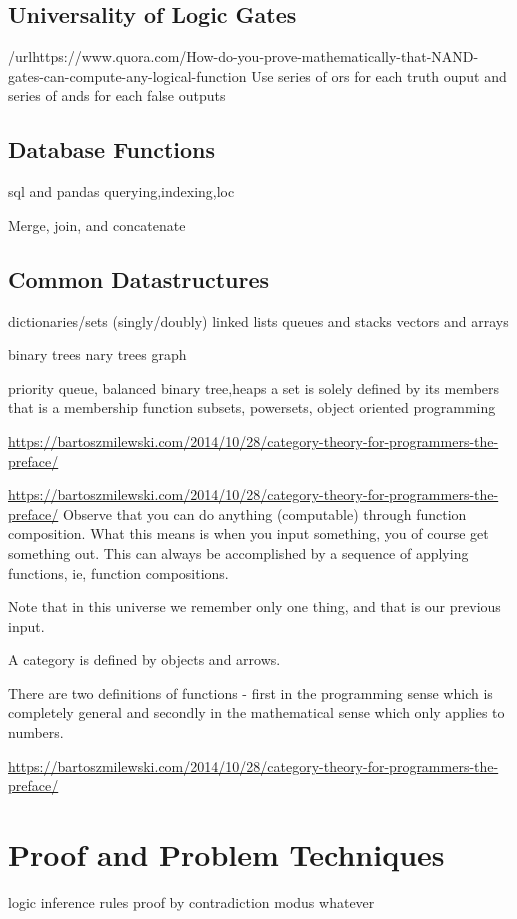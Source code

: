 \documentclass{book}
\begin{document}
\section{Universality of Logic Gates}
/url{https://www.quora.com/How-do-you-prove-mathematically-that-NAND-gates-can-compute-any-logical-function}
Use series of ors for each truth ouput and series of ands for each false outputs

\section{Database Functions}
sql and pandas
querying,indexing,loc

Merge, join, and concatenate

\section{Common Datastructures}
dictionaries/sets
(singly/doubly) linked lists
queues and stacks
vectors and arrays

binary trees
nary trees
graph

priority queue, balanced binary tree,heaps
a set is solely defined by its members that is a membership function
subsets, powersets,
object oriented programming

\url{https://bartoszmilewski.com/2014/10/28/category-theory-for-programmers-the-preface/}


\url{https://bartoszmilewski.com/2014/10/28/category-theory-for-programmers-the-preface/}
Observe that you can do anything (computable) through function composition. What this means is when you input something, you of course get something out. This can always be accomplished by  a sequence of applying functions, ie, function compositions.

Note that in this universe we remember only one thing, and that is our previous input.

A category is defined by objects and arrows.

There are two definitions of functions - first in the programming sense which is completely general and secondly in the mathematical sense which only applies to numbers.



\url{https://bartoszmilewski.com/2014/10/28/category-theory-for-programmers-the-preface/}




\chapter{Proof and Problem Techniques}
logic inference rules
proof by contradiction
modus whatever
\end{document}
